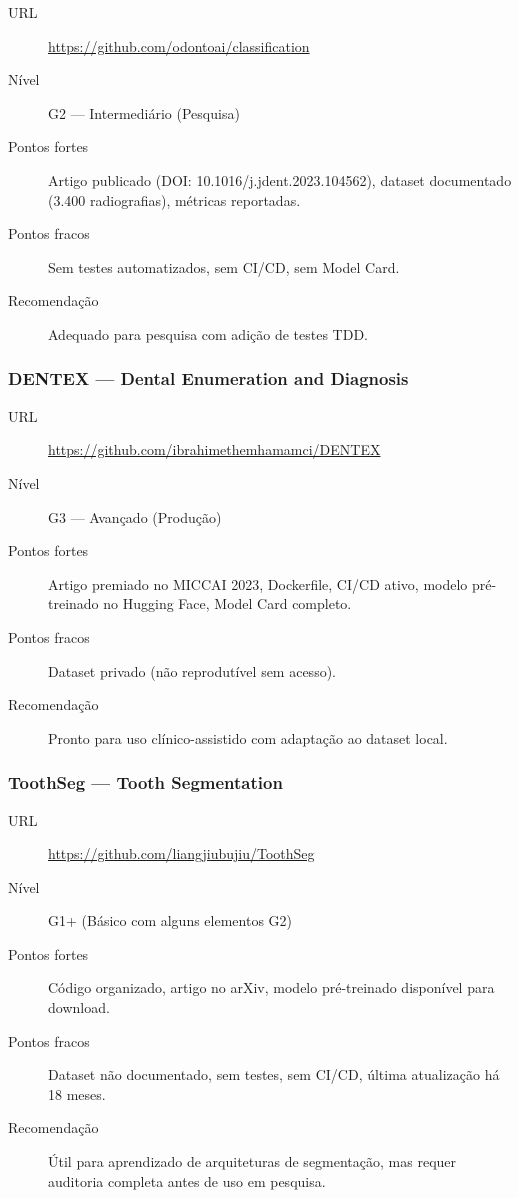 \begin{description}
  \item[URL] \url{https://github.com/odontoai/classification}
  \item[Nível] G2 — Intermediário (Pesquisa)
  \item[Pontos fortes] Artigo publicado (DOI: 10.1016/j.jdent.2023.104562),
    dataset documentado (3.400 radiografias), métricas reportadas.
  \item[Pontos fracos] Sem testes automatizados, sem CI/CD, sem Model Card.
  \item[Recomendação] Adequado para pesquisa com adição de testes TDD.
\end{description}

\subsubsection{DENTEX — Dental Enumeration and Diagnosis}

\begin{description}
  \item[URL] \url{https://github.com/ibrahimethemhamamci/DENTEX}
  \item[Nível] G3 — Avançado (Produção)
  \item[Pontos fortes] Artigo premiado no MICCAI 2023, Dockerfile,
    CI/CD ativo, modelo pré-treinado no Hugging Face, Model Card completo.
  \item[Pontos fracos] Dataset privado (não reprodutível sem acesso).
  \item[Recomendação] Pronto para uso clínico-assistido com adaptação
    ao dataset local.
\end{description}

\subsubsection{ToothSeg — Tooth Segmentation}

\begin{description}
  \item[URL] \url{https://github.com/liangjiubujiu/ToothSeg}
  \item[Nível] G1+ (Básico com alguns elementos G2)
  \item[Pontos fortes] Código organizado, artigo no arXiv, modelo
    pré-treinado disponível para download.
  \item[Pontos fracos] Dataset não documentado, sem testes, sem CI/CD,
    última atualização há 18 meses.
  \item[Recomendação] Útil para aprendizado de arquiteturas de
    segmentação, mas requer auditoria completa antes de uso em pesquisa.
\end{description}


